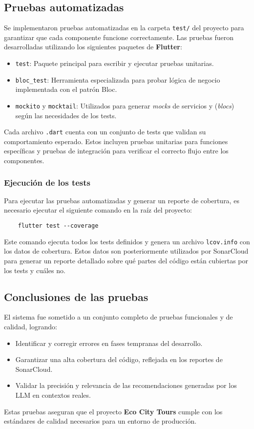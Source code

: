 \subsection{Pruebas automatizadas}

Se implementaron pruebas automatizadas en la carpeta \texttt{test/} del proyecto para garantizar que cada componente funcione correctamente. Las pruebas fueron desarrolladas utilizando los siguientes paquetes de \textbf{Flutter}:

\begin{itemize}
	\item \texttt{test}: Paquete principal para escribir y ejecutar pruebas unitarias.
	\item \texttt{bloc\_test}: Herramienta especializada para probar lógica de negocio implementada con el patrón Bloc.
	\item \texttt{mockito} y \texttt{mocktail}: Utilizados para generar \textit{mocks} de servicios y (\textit{blocs}) según las necesidades de los tests.
\end{itemize}

Cada archivo \texttt{.dart} cuenta con un conjunto de tests que validan su comportamiento esperado. Estos incluyen pruebas unitarias para funciones específicas y pruebas de integración para verificar el correcto flujo entre los componentes.

\subsubsection{Ejecución de los tests}

Para ejecutar las pruebas automatizadas y generar un reporte de cobertura, es necesario ejecutar el siguiente comando en la raíz del proyecto:
\begin{verbatim}
	flutter test --coverage
\end{verbatim}

Este comando ejecuta todos los tests definidos y genera un archivo \texttt{lcov.info} con los datos de cobertura. Estos datos son posteriormente utilizados por SonarCloud para generar un reporte detallado sobre qué partes del código están cubiertas por los tests y cuáles no.

\subsection{Conclusiones de las pruebas}

El sistema fue sometido a un conjunto completo de pruebas funcionales y de calidad, logrando:
\begin{itemize}
	\item Identificar y corregir errores en fases tempranas del desarrollo.
	\item Garantizar una alta cobertura del código, reflejada en los reportes de SonarCloud.
	\item Validar la precisión y relevancia de las recomendaciones generadas por los LLM en contextos reales.
\end{itemize}

Estas pruebas aseguran que el proyecto \textbf{Eco City Tours} cumple con los estándares de calidad necesarios para un entorno de producción.
